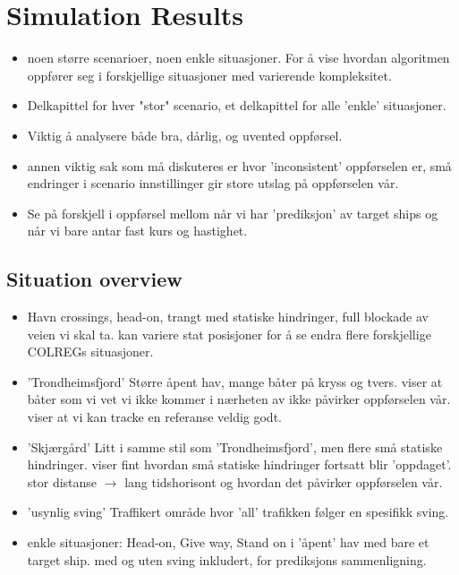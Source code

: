 \section{Simulation Results}
\begin{itemize}
    \item noen større scenarioer, noen enkle situasjoner. For å vise hvordan algoritmen oppfører seg i forskjellige situasjoner med varierende kompleksitet.
    \item Delkapittel for hver "stor" scenario, et delkapittel for alle 'enkle' situasjoner.
    \item Viktig å analysere både bra, dårlig, og uvented oppførsel.
    \item annen viktig sak som må diskuteres er hvor 'inconsistent' oppførselen er, små endringer i scenario innstillinger gir store utslag på oppførselen vår.
    \item Se på forskjell i oppførsel mellom når vi har 'prediksjon' av target ships og når vi bare antar fast kurs og hastighet.
\end{itemize}

\subsection{Situation overview}
\begin{itemize}
    \item Havn
    \subitem crossings, head-on, trangt med statiske hindringer, full blockade av veien vi skal ta.
    \subitem kan variere stat posisjoner for å se endra flere forskjellige COLREGs situasjoner.
    \item 'Trondheimsfjord'
    \subitem Større åpent hav, mange båter på kryss og tvers.
    \subitem viser at båter som vi vet vi ikke kommer i nærheten av ikke påvirker oppførselen vår.
    \subitem viser at vi kan tracke en referanse veldig godt.
    \item 'Skjærgård'
    \subitem Litt i samme stil som 'Trondheimsfjord', men flere små statiske hindringer.
    \subitem viser fint hvordan små statiske hindringer fortsatt blir 'oppdaget'.
    \subitem stor distanse $\rightarrow$ lang tidshorisont og hvordan det påvirker oppførselen vår.
    \item 'usynlig sving'
    \subitem Traffikert område hvor 'all' trafikken følger en spesifikk sving.
    \item enkle situasjoner:
    \subitem Head-on, Give way, Stand on i 'åpent' hav med bare et target ship.
    \subitem med og uten sving inkludert, for prediksjons sammenligning.
\end{itemize}

